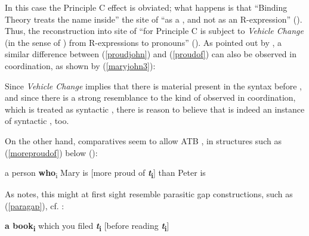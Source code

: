 In this case the Principle C effect is obviated; what happens is that ``Binding Theory treats the name inside'' the site of  ``as a , and not as an R-expression'' (\citealt[16]{lechner2004}). Thus, the reconstruction into site of  ``for Principle C is subject to \textit{Vehicle Change} (in the sense of \citealt{fiengomay1994}) from R-expressions to pronouns'' (\citealt[16]{lechner2004}). As pointed out by \citet[16, ex. 26]{lechner2004}, a similar difference between (\ref{proudjohn}) and (\ref{proudof}) can also be observed in coordination, as shown by (\ref{maryjohn3}):

\ea \label{maryjohn3}
\z
\z

Since \textit{Vehicle Change} implies that there is material present in the syntax before , and since there is a strong resemblance to the kind of  observed in coordination, which is treated as syntactic , there is reason to believe that  is indeed an instance of syntactic , too.

On the other hand, comparatives seem to allow ATB , in structures such as (\ref{moreproudof}) below (\citealt[19, ex. 35]{lechner2004}):

\ea	a person \textbf{who}\textsubscript{i} Mary is [more proud of \textbf{\emph{t}\textsubscript{i}}] than Peter is \underline{\hspace{1cm}}\\ \label{moreproudof}
\z

As \citet[19]{lechner2004} notes, this might at first sight resemble parasitic gap constructions, such as (\ref{paragap}), cf. \citet[19, ex. 36]{lechner2004}:

\ea \textbf{a book\textsubscript{i}} which you filed \textbf{\emph{t}\textsubscript{i}} [before reading \textbf{\emph{t}\textsubscript{i}}] \label{paragap}
\z

